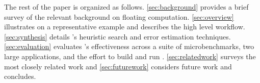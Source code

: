 \documentclass[paper.tex]{subfiles}
\begin{document}
The rest of the paper is organized as follows.  \cref{sec:background}
provides a brief survey of the relevant background on floating
computation.  \cref{sec:overview} illustrates \casio on a
representative example and describes the high level \casio workflow.
\cref{sec:synthesis} details \casio's heuristic search and error
estimation techniques.  \cref{sec:evaluation} evaluates \casio's
effectiveness across a suite of microbenchmarks, two large
applications, and the effort to build and run \casio.
\cref{sec:relatedwork} surveys the most closely related work and
\cref{sec:futurework} considers future work and concludes.







\end{document}
